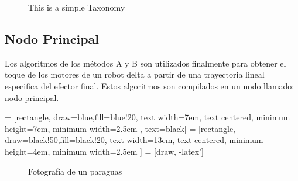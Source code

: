 \begin{center}
\begin{figure}[H]
            
                \caption{This is a simple Taxonomy}
                \label{fig:my_label}
        \end{figure}
 \end{center}
   
    \newpage
    
    \subsection{Nodo Principal}\label{nodoprincipal_tray}
    Los algoritmos de los métodos A y B son utilizados finalmente para obtener el toque de los motores de un robot delta a partir de una trayectoria lineal especifica del efector final. Estos algoritmos son compilados en un nodo llamado: nodo principal. 
    
         = [rectangle, draw=blue,fill=blue!20, text width=7em, text centered, minimum height=7em, minimum width=2.5em , text=black]
         = [rectangle, draw=black!50,fill=black!20, text width=13em, text centered, minimum height=4em, minimum width=2.5em ]
         = [draw, -latex']
         \begin{center}
         \begin{figure}[htb]
                \caption{Fotografía de un paraguas}
                \label{f:Cap6_funtion_1}
         \end{figure}
         \end{center}
         
